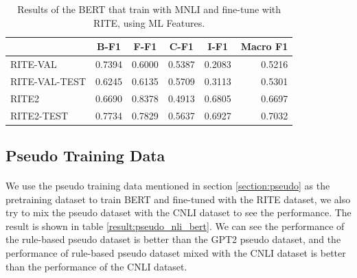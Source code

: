 \documentclass{article}
\begin{document}
\begin{CJK*}{UTF8}{bkai}
\begin{table}[!ht]
  \centering
  \begin{tabular}{|l|r|r|r|r|r|}
  \hline
   & \multicolumn{1}{c|}{B-F1} & \multicolumn{1}{c|}{F-F1} & \multicolumn{1}{c|}{C-F1} & \multicolumn{1}{c|}{I-F1} & \multicolumn{1}{c|}{Macro F1} \\ \hline
  RITE-VAL & 0.7394 & 0.6000 & 0.5387 & 0.2083 & 0.5216 \\ \hline
  RITE-VAL-TEST & 0.6245 & 0.6135 & 0.5709 & 0.3113 & 0.5301 \\ \hline
  RITE2 & 0.6690 & 0.8378 & 0.4913 & 0.6805 & 0.6697 \\ \hline
  RITE2-TEST & 0.7734 & 0.7829 & 0.5637 & 0.6927 & 0.7032 \\ \hline
  \end{tabular}
  \caption{Results of the BERT that train with MNLI and fine-tune with RITE, using ML Features.}
  \label{result:bert_mnli_ft}
\end{table}

\subsection{Pseudo Training Data}
\paragraph{}
We use the pseudo training data mentioned in section \ref{section:pseudo} as the pretraining dataset to train BERT and fine-tuned with the RITE dataset, we also try to mix the pseudo dataset with the CNLI dataset to see the performance. The result is shown in table \ref{result:pseudo_nli_bert}. We can see the performance of the rule-based pseudo dataset is better than the GPT2 pseudo dataset, and the performance of rule-based pseudo dataset mixed with the CNLI dataset is better than the performance of the CNLI dataset.


\end{CJK*}
\end{document}
